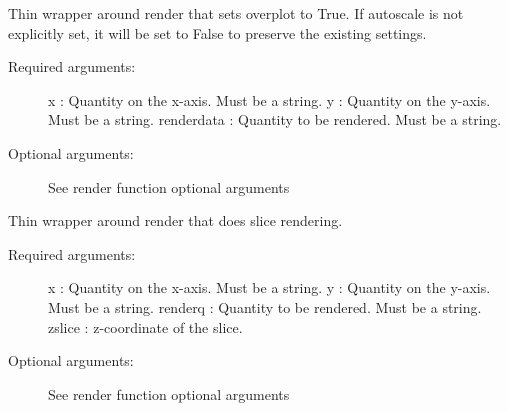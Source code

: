 \documentclass[letterpaper,10pt,english]{sphinxmanual}
\begin{document}
\begin{fulllineitems}
\label{index:facade.addrender}
Thin wrapper around render that sets overplot to True.  If autoscale is
not explicitly set, it will be set to False to preserve the existing settings.
\begin{description}
\item[{Required arguments:}] \leavevmode
x          : Quantity on the x-axis. Must be a string.
y          : Quantity on the y-axis. Must be a string.
renderdata : Quantity to be rendered. Must be a string.

\item[{Optional arguments:}] \leavevmode
See render function optional arguments

\end{description}

\end{fulllineitems}


\begin{fulllineitems}
\label{index:facade.renderslice}
Thin wrapper around render that does slice rendering.
\begin{description}
\item[{Required arguments:}] \leavevmode
x          : Quantity on the x-axis. Must be a string.
y          : Quantity on the y-axis. Must be a string.
renderq    : Quantity to be rendered. Must be a string.
zslice     : z-coordinate of the slice.

\item[{Optional arguments:}] \leavevmode
See render function optional arguments

\end{description}

\end{fulllineitems}

\end{document}
